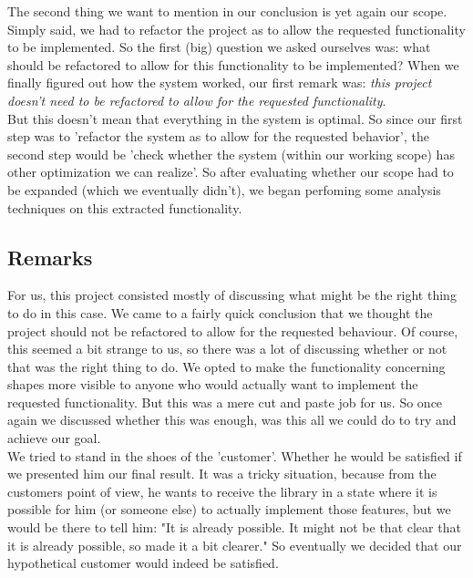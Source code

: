 \documentclass{article}
\begin{document}
The second thing we want to mention in our conclusion is yet again our scope. Simply said, we had to refactor the project as to allow the requested functionality to be implemented. So the first (big) question we asked ourselves was: what should be refactored to allow for this functionality to be implemented? When we finally figured out how the system worked, our first remark was: \textit{this project doesn't need to be refactored to allow for the requested functionality}.\\

But this doesn't mean that everything in the system is optimal. So since our first step was to 'refactor the system as to allow for the requested behavior', the second step would be 'check whether the system (within our working scope) has other optimization we can realize'. So after evaluating whether our scope had to be expanded (which we eventually didn't), we began perfoming some analysis techniques on this extracted functionality.

\subsection{Remarks}

For us, this project consisted mostly of discussing what might be the right thing to do in this case. We came to a fairly quick conclusion that we thought the project should not be refactored to allow for the requested behaviour. Of course, this seemed a bit strange to us, so there was a lot of discussing whether or not that was the right thing to do. We opted to make the functionality concerning shapes more visible to anyone who would actually want to implement the requested functionality. But this was a mere cut and paste job for us. So once again we discussed whether this was enough, was this all we could do to try and achieve our goal.\\

We tried to stand in the shoes of the 'customer'. Whether he would be satisfied if we presented him our final result. It was a tricky situation, because from the customers point of view, he wants to receive the library in a state where it is possible for him (or someone else) to actually implement those features, but we would be there to tell him: "It is already possible. It might not be that clear that it is already possible, so made it a bit clearer." So eventually we decided that our hypothetical customer would indeed be satisfied.\\
\end{document}
